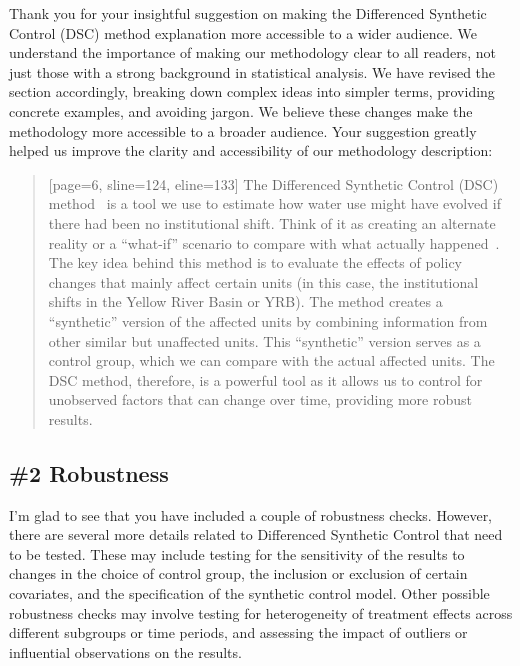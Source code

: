 \AR{} Thank you for your insightful suggestion on making the Differenced Synthetic Control (DSC) method explanation more accessible to a wider audience. We understand the importance of making our methodology clear to all readers, not just those with a strong background in statistical analysis. We have revised the section accordingly, breaking down complex ideas into simpler terms, providing concrete examples, and avoiding jargon. We believe these changes make the methodology more accessible to a broader audience. Your suggestion greatly helped us improve the clarity and accessibility of our methodology description:

\begin{quote}[page=6, sline=124, eline=133]
    The Differenced Synthetic Control (DSC) method~\cite{arkhangelsky2021} is a tool we use to estimate how water use might have evolved if there had been no institutional shift.
    Think of it as creating an alternate reality or a ``what-if'' scenario to compare with what actually happened~\cite{abadie2010, abadie2015, hill2021}.
    The key idea behind this method is to evaluate the effects of policy changes that mainly affect certain units (in this case, the institutional shifts in the Yellow River Basin or YRB).
    The method creates a ``synthetic'' version of the affected units by combining information from other similar but unaffected units. This ``synthetic'' version serves as a control group, which we can compare with the actual affected units.
    The DSC method, therefore, is a powerful tool as it allows us to control for unobserved factors that can change over time, providing more robust results.
\end{quote}

\subsection{\#2 Robustness}\label{sec:2-2}

\RC{} I'm glad to see that you have included a couple of robustness checks. However, there are several more details related to Differenced Synthetic Control that need to be tested. These may include testing for the sensitivity of the results to changes in the choice of control group, the inclusion or exclusion of certain covariates, and the specification of the synthetic control model. Other possible robustness checks may involve testing for heterogeneity of treatment effects across different subgroups or time periods, and assessing the impact of outliers or influential observations on the results.

